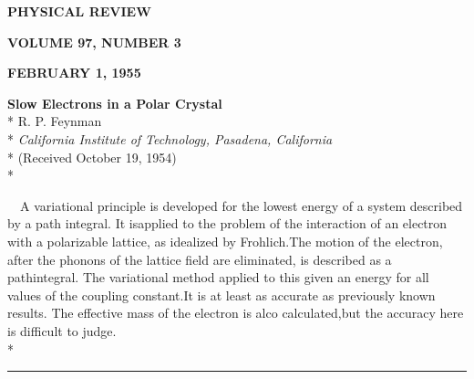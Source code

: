 \documentclass[8pt,a4paper]{extarticle}
\begin{document}
\begin{multicols}{3}

	\begin{flushleft}
		\uppercase{\textbf{physical review}}
	\end{flushleft}
	\columnbreak

	\begin{center}
		\uppercase{\textbf{volume 97, number 3}}
	\end{center}
	\columnbreak

	\begin{flushright}
		\uppercase{\textbf{february 1, 1955}}
	\end{flushright}

\end{multicols}

\begin{center}
	\LARGE{\textbf{Slow Electrons in a Polar Crystal}}\\*
	\bigskip
	\small{R. P. Feynman}\\*
	\small{\textit{California Institute of Technology, Pasadena, California}}\\*
	(Received October 19, 1954)\\*
	\bigskip
	\begin{minipage}[c]{0.85\textwidth}
			\small{~~A variational principle is developed for the lowest energy of a system described by a path integral. It is\linebreak applied to the problem of the interaction of an electron with a polarizable lattice, as idealized by Frohlich.\linebreak The motion of the electron, after the phonons of the lattice field are eliminated, is described as a path\linebreak integral. The variational method applied to this given an energy for all values of the coupling constant.\linebreak It is at least as accurate as previously known results. The effective mass of the electron is alco calculated,\linebreak but the accuracy here is difficult to judge.}\\*
	\end{minipage}

	\bigskip

	\rule{4cm}{0.1pt}

	\bigskip

\end{center}
\setlength{\columnsep}{0.5cm}
\end{document}
